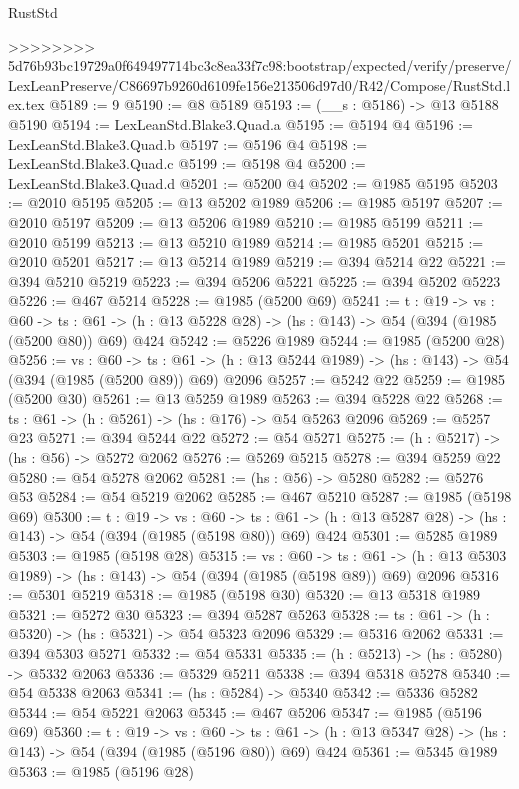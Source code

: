 \begin{lexlean}{RustStd}
\begin{coremodule}
{\begin{coremodule}
{{{{{{{{{{>>>>>>>> 5d76b93bc19729a0f649497714bc3c8ea33f7c98:bootstrap/expected/verify/preserve/LexLeanPreserve/C86697b9260d6109fe156e213506d97d0/R42/Compose/RustStd.lex.tex
@5189 := 9
@5190 := @8 @5189
@5193 := (__s : @5186) -> @13 @5188 @5190
@5194 := LexLeanStd.Blake3.Quad.a
@5195 := @5194 @4
@5196 := LexLeanStd.Blake3.Quad.b
@5197 := @5196 @4
@5198 := LexLeanStd.Blake3.Quad.c
@5199 := @5198 @4
@5200 := LexLeanStd.Blake3.Quad.d
@5201 := @5200 @4
@5202 := @1985 @5195
@5203 := @2010 @5195
@5205 := @13 @5202 @1989
@5206 := @1985 @5197
@5207 := @2010 @5197
@5209 := @13 @5206 @1989
@5210 := @1985 @5199
@5211 := @2010 @5199
@5213 := @13 @5210 @1989
@5214 := @1985 @5201
@5215 := @2010 @5201
@5217 := @13 @5214 @1989
@5219 := @394 @5214 @22
@5221 := @394 @5210 @5219
@5223 := @394 @5206 @5221
@5225 := @394 @5202 @5223
@5226 := @467 @5214
@5228 := @1985 (@5200 @69)
@5241 := {t : @19} ->
  {vs : @60} ->
  {ts : @61} -> (h : @13 @5228 @28) -> (hs : @143) -> @54 (@394 (@1985 (@5200 @80)) @69) @424
@5242 := @5226 @1989
@5244 := @1985 (@5200 @28)
@5256 := {vs : @60} ->
  {ts : @61} -> (h : @13 @5244 @1989) -> (hs : @143) -> @54 (@394 (@1985 (@5200 @89)) @69) @2096
@5257 := @5242 @22
@5259 := @1985 (@5200 @30)
@5261 := @13 @5259 @1989
@5263 := @394 @5228 @22
@5268 := {ts : @61} -> (h : @5261) -> (hs : @176) -> @54 @5263 @2096
@5269 := @5257 @23
@5271 := @394 @5244 @22
@5272 := @54 @5271
@5275 := (h : @5217) -> (hs : @56) -> @5272 @2062
@5276 := @5269 @5215
@5278 := @394 @5259 @22
@5280 := @54 @5278 @2062
@5281 := (hs : @56) -> @5280
@5282 := @5276 @53
@5284 := @54 @5219 @2062
@5285 := @467 @5210
@5287 := @1985 (@5198 @69)
@5300 := {t : @19} ->
  {vs : @60} ->
  {ts : @61} -> (h : @13 @5287 @28) -> (hs : @143) -> @54 (@394 (@1985 (@5198 @80)) @69) @424
@5301 := @5285 @1989
@5303 := @1985 (@5198 @28)
@5315 := {vs : @60} ->
  {ts : @61} -> (h : @13 @5303 @1989) -> (hs : @143) -> @54 (@394 (@1985 (@5198 @89)) @69) @2096
@5316 := @5301 @5219
@5318 := @1985 (@5198 @30)
@5320 := @13 @5318 @1989
@5321 := @5272 @30
@5323 := @394 @5287 @5263
@5328 := {ts : @61} -> (h : @5320) -> (hs : @5321) -> @54 @5323 @2096
@5329 := @5316 @2062
@5331 := @394 @5303 @5271
@5332 := @54 @5331
@5335 := (h : @5213) -> (hs : @5280) -> @5332 @2063
@5336 := @5329 @5211
@5338 := @394 @5318 @5278
@5340 := @54 @5338 @2063
@5341 := (hs : @5284) -> @5340
@5342 := @5336 @5282
@5344 := @54 @5221 @2063
@5345 := @467 @5206
@5347 := @1985 (@5196 @69)
@5360 := {t : @19} ->
  {vs : @60} ->
  {ts : @61} -> (h : @13 @5347 @28) -> (hs : @143) -> @54 (@394 (@1985 (@5196 @80)) @69) @424
@5361 := @5345 @1989
@5363 := @1985 (@5196 @28)
}}}}}}}}}}
\end{coremodule}}
\end{coremodule}
\end{lexlean}
